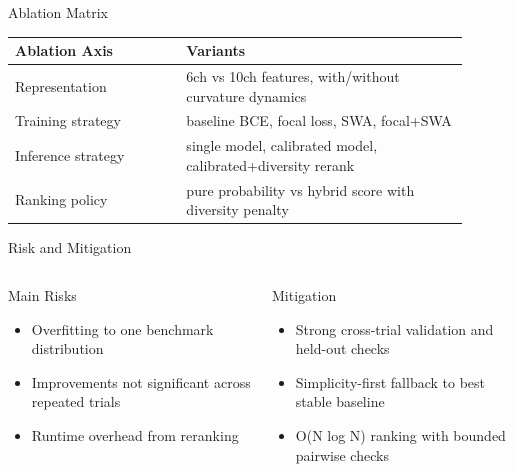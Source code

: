 ﻿\documentclass[10pt,aspectratio=169]{beamer}
\begin{document}
\begin{frame}{Ablation Matrix}
\small
\begin{table}
\centering
\begin{tabular}{p{0.34\linewidth}p{0.56\linewidth}}
\toprule
Ablation Axis & Variants \\
\midrule
Representation & 6ch vs 10ch features, with/without curvature dynamics \\
Training strategy & baseline BCE, focal loss, SWA, focal+SWA \\
Inference strategy & single model, calibrated model, calibrated+diversity rerank \\
Ranking policy & pure probability vs hybrid score with diversity penalty \\
\bottomrule
\end{tabular}
\end{table}
\end{frame}

\begin{frame}{Risk and Mitigation}
\begin{columns}[T,onlytextwidth]
\begin{block}{Main Risks}
\begin{itemize}
  \item Overfitting to one benchmark distribution
  \item Improvements not significant across repeated trials
  \item Runtime overhead from reranking
\end{itemize}
\end{block}

\begin{block}{Mitigation}
\begin{itemize}
  \item Strong cross-trial validation and held-out checks
  \item Simplicity-first fallback to best stable baseline
  \item O(N log N) ranking with bounded pairwise checks
\end{itemize}
\end{block}
\end{columns}
\end{frame}
\end{document}
